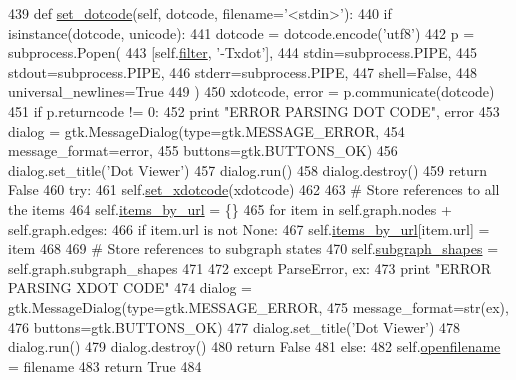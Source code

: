 \begin{DoxyCode}
439   \textcolor{keyword}{def }\hyperlink{classsmacc__viewer_1_1xdot_1_1wxxdot_1_1WxDotWindow_a084b2da43dc34069d401b902be4595c1}{set\_dotcode}(self, dotcode, filename='<stdin>'):
440     \textcolor{keywordflow}{if} isinstance(dotcode, unicode):
441       dotcode = dotcode.encode(\textcolor{stringliteral}{'utf8'})
442     p = subprocess.Popen(
443       [self.\hyperlink{classsmacc__viewer_1_1xdot_1_1wxxdot_1_1WxDotWindow_a28b94154e31dbeab4f0d97a23b29bc39}{filter}, \textcolor{stringliteral}{'-Txdot'}],
444       stdin=subprocess.PIPE,
445       stdout=subprocess.PIPE,
446       stderr=subprocess.PIPE,
447       shell=\textcolor{keyword}{False},
448       universal\_newlines=\textcolor{keyword}{True}
449     )
450     xdotcode, error = p.communicate(dotcode)
451     \textcolor{keywordflow}{if} p.returncode != 0:
452       \textcolor{keywordflow}{print} \textcolor{stringliteral}{"ERROR PARSING DOT CODE"}, error
453       dialog = gtk.MessageDialog(type=gtk.MESSAGE\_ERROR,
454                      message\_format=error,
455                      buttons=gtk.BUTTONS\_OK)
456       dialog.set\_title(\textcolor{stringliteral}{'Dot Viewer'})
457       dialog.run()
458       dialog.destroy()
459       \textcolor{keywordflow}{return} \textcolor{keyword}{False}
460     \textcolor{keywordflow}{try}:
461       self.\hyperlink{classsmacc__viewer_1_1xdot_1_1wxxdot_1_1WxDotWindow_a50d8749828c0f643e1f8a383059e8826}{set\_xdotcode}(xdotcode)
462 
463       \textcolor{comment}{# Store references to all the items}
464       self.\hyperlink{classsmacc__viewer_1_1xdot_1_1wxxdot_1_1WxDotWindow_a6583a761581fbcff431a9781d6cb6194}{items\_by\_url} = \{\}
465       \textcolor{keywordflow}{for} item \textcolor{keywordflow}{in} self.graph.nodes + self.graph.edges:
466         \textcolor{keywordflow}{if} item.url \textcolor{keywordflow}{is} \textcolor{keywordflow}{not} \textcolor{keywordtype}{None}:
467           self.\hyperlink{classsmacc__viewer_1_1xdot_1_1wxxdot_1_1WxDotWindow_a6583a761581fbcff431a9781d6cb6194}{items\_by\_url}[item.url] = item
468 
469       \textcolor{comment}{# Store references to subgraph states}
470       self.\hyperlink{classsmacc__viewer_1_1xdot_1_1wxxdot_1_1WxDotWindow_a05a20a1eb95d32c17486716fc2d47d35}{subgraph\_shapes} = self.graph.subgraph\_shapes
471 
472     \textcolor{keywordflow}{except} ParseError, ex:
473       \textcolor{keywordflow}{print} \textcolor{stringliteral}{"ERROR PARSING XDOT CODE"}
474       dialog = gtk.MessageDialog(type=gtk.MESSAGE\_ERROR,
475                      message\_format=str(ex),
476                      buttons=gtk.BUTTONS\_OK)
477       dialog.set\_title(\textcolor{stringliteral}{'Dot Viewer'})
478       dialog.run()
479       dialog.destroy()
480       \textcolor{keywordflow}{return} \textcolor{keyword}{False}
481     \textcolor{keywordflow}{else}:
482       self.\hyperlink{classsmacc__viewer_1_1xdot_1_1wxxdot_1_1WxDotWindow_a5ad7e5589b8697223cd75fb03e4c0d93}{openfilename} = filename
483       \textcolor{keywordflow}{return} \textcolor{keyword}{True}
484 
\end{DoxyCode}



